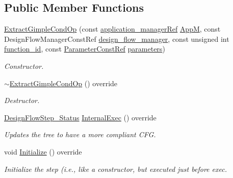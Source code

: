\subsection*{Public Member Functions}
\begin{DoxyCompactItemize}
\item 
\hyperlink{classExtractGimpleCondOp_a380c10f0841276b9179b8964b17019f2}{Extract\+Gimple\+Cond\+Op} (const \hyperlink{application__manager_8hpp_a04ccad4e5ee401e8934306672082c180}{application\+\_\+manager\+Ref} \hyperlink{classFrontendFlowStep_a0ac0d8db2a378416583f51c4faa59d15}{AppM}, const Design\+Flow\+Manager\+Const\+Ref \hyperlink{classDesignFlowStep_ab770677ddf087613add30024e16a5554}{design\+\_\+flow\+\_\+manager}, const unsigned int \hyperlink{classFunctionFrontendFlowStep_a58ef2383ad1a212a8d3f396625a4b616}{function\+\_\+id}, const \hyperlink{Parameter_8hpp_a37841774a6fcb479b597fdf8955eb4ea}{Parameter\+Const\+Ref} \hyperlink{classDesignFlowStep_a802eaafe8013df706370679d1a436949}{parameters})
\begin{DoxyCompactList}\small\item\em Constructor. \end{DoxyCompactList}\item 
\hyperlink{classExtractGimpleCondOp_aa48e5602260eb94b3cf274d7ab7bc9ed}{$\sim$\+Extract\+Gimple\+Cond\+Op} () override
\begin{DoxyCompactList}\small\item\em Destructor. \end{DoxyCompactList}\item 
\hyperlink{design__flow__step_8hpp_afb1f0d73069c26076b8d31dbc8ebecdf}{Design\+Flow\+Step\+\_\+\+Status} \hyperlink{classExtractGimpleCondOp_a13ce7e78bf548c98b3ed74e92d77df30}{Internal\+Exec} () override
\begin{DoxyCompactList}\small\item\em Updates the tree to have a more compliant C\+FG. \end{DoxyCompactList}\item 
void \hyperlink{classExtractGimpleCondOp_aa5ad36991f470b0fae011ed6d5c77094}{Initialize} () override
\begin{DoxyCompactList}\small\item\em Initialize the step (i.\+e., like a constructor, but executed just before exec. \end{DoxyCompactList}\end{DoxyCompactItemize}
